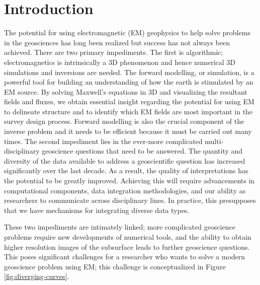\documentclass[paper]{geophysics}
\begin{document}
\renewcommand{\figdir}{./figures} %

\section{Introduction}

The potential for using electromagnetic (EM) geophysics to help solve problems in the geosciences has long been realized but success has not always been achieved. There are two primary impediments. The first is algorithmic; electromagnetics is intrinsically a 3D phenomenon and hence numerical 3D simulations and inversions are needed. The forward modelling, or simulation, is a powerful tool for building an understanding of how the earth is stimulated by an EM source. By solving Maxwell's equations in 3D and visualizing the resultant fields and fluxes, we obtain essential insight regarding the potential for using EM to delineate structure and to identify which EM fields are most important in the survey design process. Forward modelling is also the crucial component of the inverse problem and it needs to be efficient because it must be carried out many times. The second impediment lies in the ever-more complicated multi-disciplinary geoscience questions that need to be answered. The quantity and diversity of the data available to address a geoscientific question has increased significantly over the last decade. As a result, the quality of interpretations has the potential to be greatly improved. Achieving this will require advancements in computational components, data integration methodologies, and our ability as researchers to communicate across disciplinary lines. In practice, this presupposes that we have mechanisms for integrating diverse data types.

These two impediments are intimately linked; more complicated geoscience problems require new developments of numerical tools, and the ability to obtain higher resolution images of the subsurface leads to further geoscience questions. This poses significant challenges for a researcher who wants to solve a modern geoscience problem using EM; this challenge is conceptualized in Figure \ref{fig:diverging-curves}.




\end{document}
